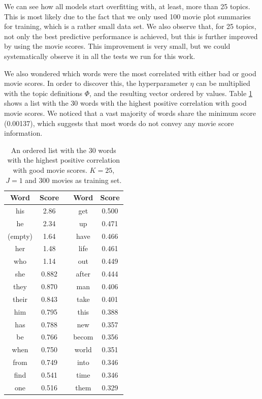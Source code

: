 \documentclass{article} %
\begin{document}
We can see how all models start overfitting with, at least, more than 25 topics.
This is most likely due to the fact that we only used 100 movie plot summaries for training, which is a rather small data set. 
We also observe that, for 25 topics, not only the best predictive performance is achieved, but this is further improved by using the movie scores.
This improvement is very small, but we could systematically observe it in all the tests we run for this work. 

We also wondered which words were the most correlated with either bad or good movie scores. In order to discover this, the hyperparameter $\eta$ can be multiplied with the topic definitions $\Phi$, and the resulting vector ordered by values. Table \ref{table:word_scores} shows a list with the 30 words with the highest positive correlation with good movie scores. We noticed that a vast majority of words share the minimum score (0.00137), which suggests that most words do not convey any movie score information.

\begin{table}[ht!]
\captionsetup{justification=centering}
\caption{An ordered list with the 30 words with the highest positive correlation\\with good movie scores. $K = 25$, $J = 1$ and 300 movies as training set.}
\label{table:word_scores}
\begin{center}
\begin{tabular}{c|ccc|c}
Word & Score  & \hspace*{1cm} & Word & Score \\ \hline
his &	 2.86 &&	get &	 0.500 \\
he &	 2.34 &&	up &	 0.471 \\
(empty) &1.64 &&	have &	 0.466 \\
her &	 1.48 &&	life &	 0.461 \\
who &	 1.14 &&	out &	 0.449 \\
she &	 0.882 &&	after &	 0.444 \\
they &	 0.870 &&	man &	 0.406 \\
their &	 0.843 &&	take &	 0.401 \\
him &	 0.795 &&	this &	 0.388 \\
has &	 0.788 &&	new &	 0.357 \\
be &	 0.766 &&	becom &	 0.356 \\
when &	 0.750 &&	world &	 0.351 \\
from &	 0.749 &&	into &	 0.346 \\
find &	 0.541 &&	time &	 0.346 \\
one &	 0.516 &&	them &	 0.329
\end{tabular}
\end{center}
\end{table}
\end{document}
